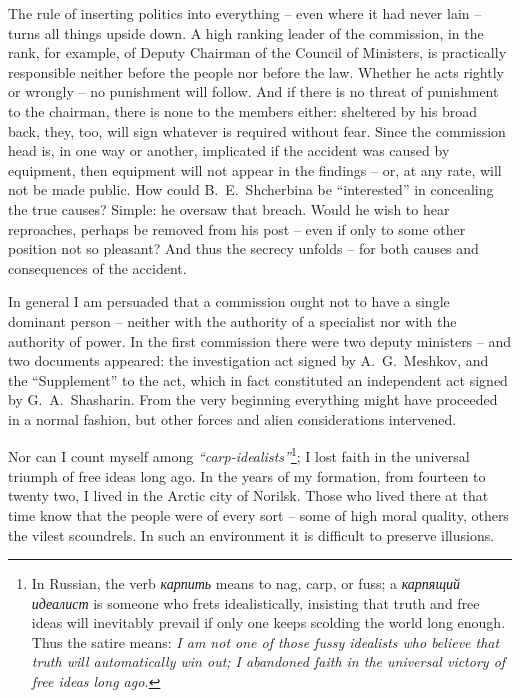 \documentclass[openright]{bookest}
\begin{document}
The rule of inserting politics into everything -- even where it had never lain -- turns all things upside down. A high ranking leader of the commission, in the rank, for example, of Deputy Chairman of the Council of Ministers, is practically responsible neither before the people nor before the law. Whether he acts rightly or wrongly -- no punishment will follow. And if there is no threat of punishment to the chairman, there is none to the members either: sheltered by his broad back, they, too, will sign whatever is required without fear. Since the commission head is, in one way or another, implicated if the accident was caused by equipment, then equipment will not appear in the findings -- or, at any rate, will not be made public. How could B.~E.~Shcherbina be ``interested'' in concealing the true causes? Simple: he oversaw that breach. Would he wish to hear reproaches, perhaps be removed from his post -- even if only to some other position not so pleasant? And thus the secrecy unfolds -- for both causes and consequences of the accident.

In general I am persuaded that a commission ought not to have a single dominant person -- neither with the authority of a specialist nor with the authority of power. In the first commission there were two deputy ministers -- and two documents appeared: the investigation act signed by A.~G.~Meshkov, and the ``Supplement'' to the act, which in fact constituted an independent act signed by G.~A.~Shasharin. From the very beginning everything might have proceeded in a normal fashion, but other forces and alien considerations intervened.

Nor can I count myself among \textit{``carp-idealists''}\footnote{In Russian, the verb \textit{карпить} means to nag, carp, or fuss; a \textit{карпящий идеалист} is someone who frets idealistically, insisting that truth and free ideas will inevitably prevail if only one keeps scolding the world long enough. Thus the satire means: \textit{I am not one of those fussy idealists who believe that truth will automatically win out; I abandoned faith in the universal victory of free ideas long ago.}}; I lost faith in the universal triumph of free ideas long ago. In the years of my formation, from fourteen to twenty two, I lived in the Arctic city of Norilsk. Those who lived there at that time know that the people were of every sort -- some of high moral quality, others the vilest scoundrels. In such an environment it is difficult to preserve illusions.

\end{document}
